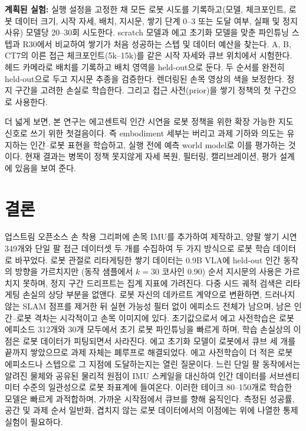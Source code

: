\documentclass[conference,10pt]{IEEEtran}
\begin{document}
\textbf{계획된 실험:} 실행 설정을 고정한 채 모든 로봇 시도를 기록하고(모델, 체크포인트, 로봇 데이터 크기, 시작 자세, 배치, 지시문,
쌓기 단계 0--3 또는 도달 여부, 실패 및 정지 사유) 모델당 20--30회 시도한다. scratch 모델과 에고 초기화 모델을 맞춘 파인튜닝 스텝과
R30에서 비교하여 쌓기가 처음 성공하는 스텝 및 데이터 예산을 찾는다. A, B, CT7의 이른 접근 체크포인트(5k--15k)를 같은 시작 자세와
큐브 위치에서 시험한다. 헤드 카메라로 배치를 기록하고 배치 영역을 held-out으로 둔다. 두 순서를 완전히 held-out으로 두고 지시문
추종을 검증한다. 렌더링된 손목 영상의 색을 보정한다. 정지 구간을 고려한 손실로 학습한다. 그리고 접근 사전(prior)을 쌓기 정책의 첫
구간으로 사용한다.

더 넓게 보면, 본 연구는 에고센트릭 인간 시연을 로봇 정책을 위한 확장 가능한 지도 신호로 쓰기 위한 첫걸음이다. 즉 embodiment 세부는
버리고 과제 기하와 의도는 유지하는 인간--로봇 표현을 학습하고, 실행 전에 예측 world model로 이를 평가하는 것이다. 현재 결과는 병목이
정책 못지않게 자세 복원, 필터링, 캘리브레이션, 평가 설계에 있음을 보여 준다.

\section{결론}
업스트림 오픈소스 손 착용 그리퍼에 손목 IMU를 추가하여 제작하고, 양팔 쌓기 시연 349개와 단일 팔 접근 데이터셋 두 개를 수집하여 두
가지 방식으로 로봇 학습 데이터로 바꾸었다. 로봇 관절로 리타게팅한 쌓기 데이터는 0.9B VLA에 held-out 인간 동작의 방향을 가르치지만
(동작 샘플에서 $k{=}30$ 코사인 0.90) 순서 지시문의 사용은 가르치지 못하며, 정지 구간 드리프트는 집계 지표에 가려진다. 다중 시드 궤적
검색은 리타게팅 손실의 상당 부분을 없앤다. 로봇 자신의 데카르트 계약으로 변환하면, 드러나지 않는 SLAM 점프를 제거한 뒤 실현 가능성
필터 없이 에피소드 전체가 남으며, 남은 인간--로봇 격차는 시각적이고 손목 이미지에 있다. 초기값으로서 에고 사전학습은 로봇 에피소드
312개와 30개 모두에서 초기 로봇 파인튜닝을 빠르게 하며, 학습 손실상의 이점은 로봇 데이터가 피팅되면서 사라진다. 에고 초기화 모델이
로봇에서 큐브 세 개를 끝까지 쌓았으므로 과제 자체는 폐루프로 해결되었다. 에고 사전학습이 더 적은 로봇 에피소드나 스텝으로 그 지점에
도달하는지는 열린 질문이다. 느린 단일 팔 동작에서는 알려진 물체와 공유된 물리적 원점이 IMU 스케일을 대신하여 인간 데이터를
서브센티미터 수준의 일관성으로 로봇 좌표계에 들여온다. 이러한 테이크 80--150개로 학습한 모델은 빠르게 과적합하며, 가까운 시작점에서
큐브를 향해 움직인다. 측정된 성공률, 공간 및 과제 순서 일반화, 겹치지 않는 로봇 데이터에서의 이점에는 위에 나열한 통제 실험이
필요하다.
\end{document}
